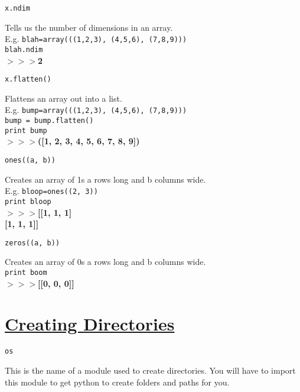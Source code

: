 \noindent \texttt{x.ndim}
\begin{myindentpar}{1.4cm}
\vspace*{-1ex}
Tells us the number of dimensions in an array.\\
E.g. \texttt{blah=array(((1,2,3), (4,5,6), (7,8,9)))}\\
\texttt{blah.ndim}\\
\textbf{$>>>$2}
\end{myindentpar}

\noindent \texttt{x.flatten()}
\begin{myindentpar}{1.4cm}
\vspace*{-1ex}
Flattens an array out into a list.\\
E.g. \texttt{bump=array(((1,2,3), (4,5,6), (7,8,9)))}\\
\texttt{bump = bump.flatten()}\\
\texttt{{\color{purple}print} bump}\\
\textbf{$>>>$([1, 2, 3, 4, 5, 6, 7, 8, 9])}
\end{myindentpar}

\noindent \texttt{ones((a, b))}
\begin{myindentpar}{1.4cm}
\vspace*{-1ex}
Creates an array of 1s a rows long and b columns wide.\\
E.g. \texttt{bloop=ones((2, 3))}\\
\texttt{{\color{purple}print} bloop}\\
\textbf{$>>>$[[1, 1, 1]}\\
\-\hspace*{0.905cm} \textbf{[1, 1, 1]]}
\end{myindentpar}

\noindent \texttt{zeros((a, b))}
\begin{myindentpar}{1.4cm}
\vspace*{-1ex}
Creates an array of 0s a rows long and b columns wide.\\
\texttt{{\color{purple}print} boom}\\
\textbf{$>>>$[[0, 0, 0]]}
\end{myindentpar}

\section*{\underline{Creating Directories}}
\noindent \texttt{os}
\begin{myindentpar}{1.4cm}
\vspace*{-1ex}
This is the name of a module used to create directories. You will have to import this module to get python to create folders and paths for you.
\end{myindentpar}

